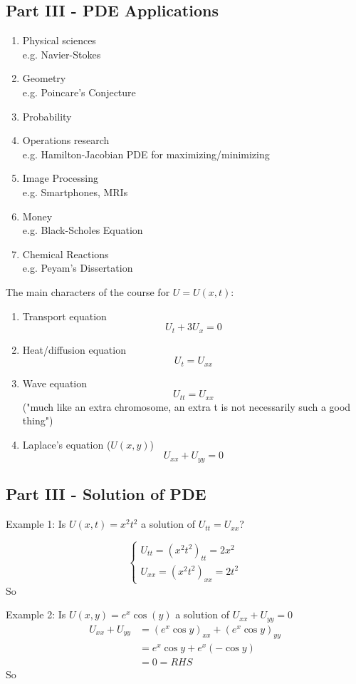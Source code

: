 \documentclass[12pt]{article}
\begin{document}
\subsection*{Part III - PDE Applications}
\begin{enumerate}
    \item Physical sciences\\
        e.g. Navier-Stokes
    \item Geometry \\
        e.g. Poincare's Conjecture
    \item Probability
    \item Operations research\\
        e.g. Hamilton-Jacobian PDE for maximizing/minimizing
    \item Image Processing\\
        e.g. Smartphones, MRIs
    \item Money\\
        e.g. Black-Scholes Equation
    \item Chemical Reactions\\
        e.g. Peyam's Dissertation    
\end{enumerate}

The main characters of the course for $U=U(x, t)$: 
\begin{enumerate}
    \item Transport equation
    \[U_t + 3U_x = 0\]
    \item Heat/diffusion equation 
    \[U_t = U_{xx}\]
    \item Wave equation
    \[U_{tt} = U_{xx}\]
    ("much like an extra chromosome, an extra t is not necessarily such a good thing")
    \item Laplace's equation ($U(x, y)$)
    \[U_{xx} + U_{yy} = 0\]
\end{enumerate}

\subsection*{Part III  - Solution of PDE}
Example 1: Is $U(x,t) = x^2 t^2$ a solution of $U_{tt} = U_{xx}$?

\[\begin{cases}
    U_{tt} = (x^2t^2)_{tt} = 2x^2\\
    U_{xx} = (x^2t^2)_{xx} = 2t^2
\end{cases}\]
So 

Example 2: Is $U(x, y) = e^x \cos(y)$ a solution of $U_{xx} +U_{yy} = 0$
\begin{align*}
    U_{xx} + U_{yy} &= (e^x \cos y)_{xx} + (e^x \cos y)_{yy}\\
    &= e^x \cos y + e^x (-\cos y)\\
    &= 0 = RHS
\end{align*}
So 
\end{document}
